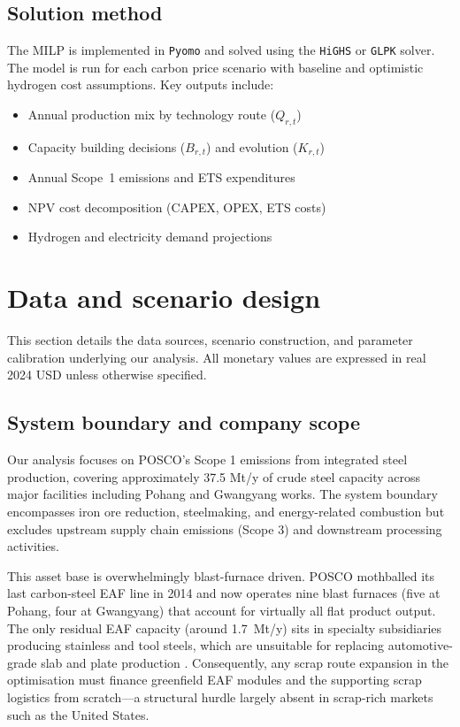 \documentclass[preprint,1p,authoryear]{elsarticle}
\begin{document}
\subsection{Solution method}
The MILP is implemented in \texttt{Pyomo} and solved using the \texttt{HiGHS} or \texttt{GLPK} solver. The model is run for each carbon price scenario with baseline and optimistic hydrogen cost assumptions. Key outputs include:
\begin{itemize}[leftmargin=*]
  \item Annual production mix by technology route ($Q_{r,t}$)
  \item Capacity building decisions ($B_{r,t}$) and evolution ($K_{r,t}$)
  \item Annual Scope~1 emissions and ETS expenditures
  \item NPV cost decomposition (CAPEX, OPEX, ETS costs)
  \item Hydrogen and electricity demand projections
\end{itemize}

\section{Data and scenario design}

This section details the data sources, scenario construction, and parameter calibration underlying our analysis. All monetary values are expressed in real 2024 USD unless otherwise specified.

\subsection{System boundary and company scope}

Our analysis focuses on POSCO's Scope 1 emissions from integrated steel production, covering approximately 37.5 Mt/y of crude steel capacity across major facilities including Pohang and Gwangyang works. The system boundary encompasses iron ore reduction, steelmaking, and energy-related combustion but excludes upstream supply chain emissions (Scope 3) and downstream processing activities.

This asset base is overwhelmingly blast-furnace driven. POSCO mothballed its last carbon-steel EAF line in 2014 and now operates nine blast furnaces (five at Pohang, four at Gwangyang) that account for virtually all flat product output. The only residual EAF capacity (around 1.7~Mt/y) sits in specialty subsidiaries producing stainless and tool steels, which are unsuitable for replacing automotive-grade slab and plate production \citep{POSCO2023SR,KOSA2024Yearbook}. Consequently, any scrap route expansion in the optimisation must finance greenfield EAF modules and the supporting scrap logistics from scratch—a structural hurdle largely absent in scrap-rich markets such as the United States.
\end{document}
